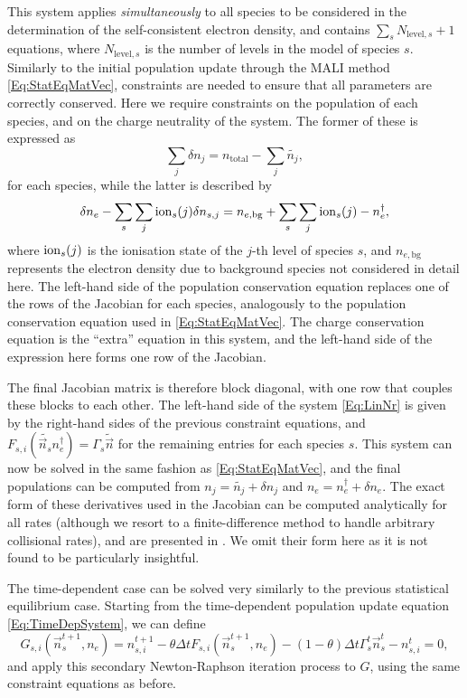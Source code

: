 This system applies \emph{simultaneously} to all species to be considered in the determination of the self-consistent electron density, and contains $\sum_s N_{\mathrm{level}, s} + 1$ equations, where $N_{\mathrm{level}, s}$ is the number of levels in the model of species $s$.
Similarly to the initial population update through the MALI method \eqref{Eq:StatEqMatVec}, constraints are needed to ensure that all parameters are correctly conserved.
Here we require constraints on the population of each species, and on the charge neutrality of the system.
The former of these is expressed as
\begin{equation}
    \sum_j \delta n_j = n_\mathrm{total} - \sum_j \widetilde{n_j},
\end{equation}
for each species, while the latter is described by
\begin{equation}
    \delta n_e - \sum_s \sum_j \operatorname{ion}_s(j) \delta n_{s, j} = n_{e, \mathrm{bg}} + \sum_s \sum_j \operatorname{ion}_s(j) - n_e^\dagger,
\end{equation}
where $\operatorname{ion}_s(j)$ is the ionisation state of the $j$-th level of species $s$, and $n_{e, \mathrm{bg}}$ represents the electron density due to background species not considered in detail here.
The left-hand side of the population conservation equation replaces one of the rows of the Jacobian for each species, analogously to the population conservation equation used in \eqref{Eq:StatEqMatVec}.
The charge conservation equation is the ``extra'' equation in this system, and the left-hand side of the expression here forms one row of the Jacobian.

The final Jacobian matrix is therefore block diagonal, with one row that couples these blocks to each other.
The left-hand side of the system \eqref{Eq:LinNr} is given by the right-hand sides of the previous constraint equations, and $F_{s, i}(\widetilde{\vec{n}_s} n_e^\dagger) = \Gamma_s \widetilde{\vec{n}}$ for the remaining entries for each species $s$.
This system can now be solved in the same fashion as \eqref{Eq:StatEqMatVec}, and the final populations can be computed from $n_j = \widetilde{n_j} + \delta n_j$ and $n_e = n_e^\dagger + \delta n_e$.
The exact form of these derivatives used in the Jacobian can be computed analytically for all rates (although we resort to a finite-difference method to handle arbitrary collisional rates), and are presented in \citet{Osborne2021}.
We omit their form here as it is not found to be particularly insightful.

The time-dependent case can be solved very similarly to the previous statistical equilibrium case.
Starting from the time-dependent population update equation \eqref{Eq:TimeDepSystem}, we can define
\begin{equation}
    \label{Eq:TimeDepNrFn}
    G_{s,i}(\vec{n}^{t+1}_s, n_e) = n^{t+1}_{s,i} - \theta \Delta t F_{s,i}(\vec{n}^{t+1}_s, n_e) - (1-\theta)\Delta t \Gamma^t_s \vec{n}^t_s - n^t_{s,i} = 0,
\end{equation}
and apply this secondary Newton-Raphson iteration process to $G$, using the same constraint equations as before.

